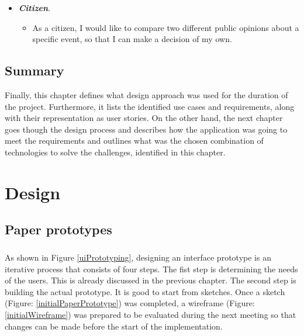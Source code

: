 \documentclass{l4proj}
\begin{document}
\begin{itemize}
	\item \textbf{\textit{Citizen}}.
	\begin{itemize}
		\item As a citizen, I would like to compare two different public opinions about a specific event, so that I can make a decision of my own. 
	\end{itemize}
\end{itemize}

\section{Summary}
Finally, this chapter defines what design approach was used for the duration of the project. Furthermore, it lists the identified use cases and requirements, along with their representation as user stories. On the other hand, the next chapter goes though the design process and describes how the application was going to meet the requirements and outlines what was the chosen combination of technologies to solve the challenges, identified in this chapter.




\chapter{Design}

\section{Paper prototypes}
\label{sec:paper-prototypes}
\paragraph{}
As shown in Figure \ref{uiPrototyping}, designing an interface prototype is an iterative process that consists of four steps. The fist step is determining the needs of the users. This is already discussed in the previous chapter. The second step is building the actual prototype. It is good to start from sketches. Once a sketch (Figure: \ref{initialPaperPrototype}) was completed, a wireframe (Figure: \ref{initialWireframe}) was prepared to be evaluated during the next meeting so that changes can be made before the start of the implementation. 
\end{document}
